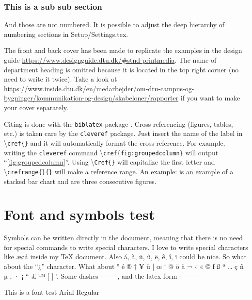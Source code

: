 \subsubsection{This is a sub sub section}
And those are not numbered. It is possible to adjust the deep hierarchy of numbering sections in Setup/Settings.tex. 

The front and back cover has been made to replicate the examples in the design guide \url{https://www.designguide.dtu.dk/#stnd-printmedia}. The name of department heading is omitted because it is located in the top right corner (no need to write it twice). Take a look at \url{https://www.inside.dtu.dk/en/medarbejder/om-dtu-campus-og-bygninger/kommunikation-og-design/skabeloner/rapporter} if you want to make your cover separately. 

Citing is done with the \texttt{biblatex} package \cite{1999_SummerSchool_Notes}. Cross referencing (figures, tables, etc.) is taken care by the \texttt{cleveref} package. Just insert the name of the label in \textbackslash \texttt{cref\{\}} and it will automatically format the cross-reference. For example, writing the \texttt{cleveref} command \textbackslash \texttt{cref\{fig:groupedcolumn\}} will output ``\cref{fig:groupedcolumn}''. Using \textbackslash \texttt{Cref\{\}} will capitalize the first letter and \textbackslash \texttt{crefrange\{\}\{\}} will make a reference range. An example:  is an example of a stacked bar chart and  are three consecutive figures.

\section{Font and symbols test}
Symbols can be written directly in the document, meaning that there is no need for special commands to write special characters. I love to write special characters like æøå inside my \TeX{} document. Also á, à, ü, û, ë, ê, î, ï could be nice. So what about the ``¿'' character. What about ° é ® † ¥ ü | œ ‘ @ ö ä ¬ ‹ « © ƒ ß ª … ç ñ µ ‚ · ¡ “ £ ™ [ ] '. Some dashes - – —, and the latex form - -- --- 

This is a font test \newline 
Arial Regular \newline 

